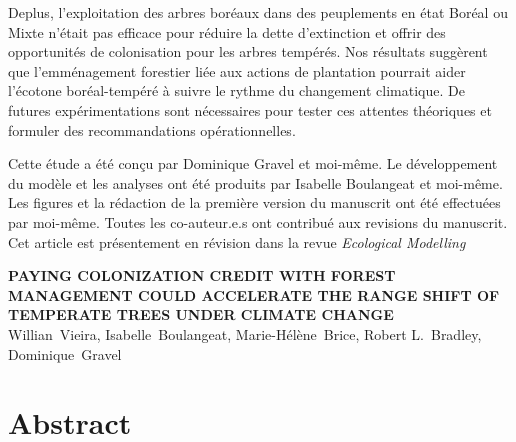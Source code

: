 Deplus, l'exploitation des arbres boréaux dans des peuplements en état
Boréal ou Mixte n'était pas efficace pour réduire la dette d'extinction
et offrir des opportunités de colonisation pour les arbres tempérés. Nos
résultats suggèrent que l'emménagement forestier liée aux actions de
plantation pourrait aider l'écotone boréal-tempéré à suivre le rythme du
changement climatique. De futures expérimentations sont nécessaires pour
tester ces attentes théoriques et formuler des recommandations
opérationnelles.

Cette étude a été conçu par Dominique Gravel et moi-même. Le
développement du modèle et les analyses ont été produits par Isabelle
Boulangeat et moi-même. Les figures et la rédaction de la première
version du manuscrit ont été effectuées par moi-même. Toutes les
co-auteur.e.s ont contribué aux revisions du manuscrit. Cet article est
présentement en révision dans la revue \emph{Ecological Modelling}

\vfill{}
\pagebreak

\begin{center}
\textbf{\MakeUppercase{Paying colonization credit with forest management
could accelerate the range shift of temperate trees under climate
change}} \\
Willian~Vieira, Isabelle~Boulangeat, Marie-Hélène~Brice, Robert
L.~Bradley, Dominique~Gravel
\end{center}

\section{Abstract}

